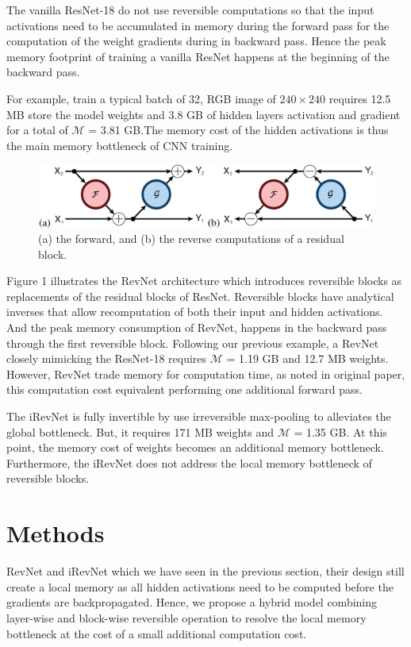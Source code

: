 \documentclass[10pt,twocolumn,letterpaper]{article}
\begin{document}
The vanilla ResNet-18 do not use reversible computations so that the input activations need to be accumulated in memory during the forward pass for the computation of the weight gradients during in backward pass. Hence the peak memory footprint of training a vanilla ResNet happens at the beginning of the backward pass.

For example, train a typical batch of 32, RGB image of $240 \times 240$ requires 12.5 MB  store the model weights and 3.8 GB of hidden layers activation and gradient for a total of  $\mathcal{M}$ = 3.81 GB.The memory cost of the hidden activations is thus the main memory bottleneck of CNN training. 
 
\begin{figure}[h]
\begin{center}
\includegraphics[width=1.0\linewidth]{Figure1.eps}
\end{center}
   \caption{(a) the forward, and (b) the reverse computations of a residual block.}
\end{figure}

Figure 1 illustrates the RevNet architecture which introduces reversible blocks as replacements of the residual blocks of ResNet. Reversible blocks have analytical inverses that allow recomputation of both their input and hidden activations. And the peak memory consumption of RevNet, happens in the backward pass through the first reversible block. Following our previous example, a RevNet closely mimicking the ResNet-18 requires $\mathcal{M}$ = 1.19 GB and 12.7 MB weights. However, RevNet trade memory for computation time, as noted in original paper, this computation cost equivalent performing one additional forward pass.

The iRevNet is fully invertible by use irreversible max-pooling to alleviates the global bottleneck. But, it requires 171 MB weights and $\mathcal{M}$ = 1.35 GB. At this point, the memory cost of weights becomes an additional memory bottleneck. Furthermore, the iRevNet does not address the local memory bottleneck of reversible blocks. 

\section{Methods} 
RevNet and iRevNet which we have seen in the previous section, their design still create a local memory as all hidden activations need to be computed before the gradients are backpropagated. Hence, we propose a hybrid model combining layer-wise and block-wise reversible operation to resolve the local memory bottleneck at the cost of a small additional computation cost.
\end{document}
